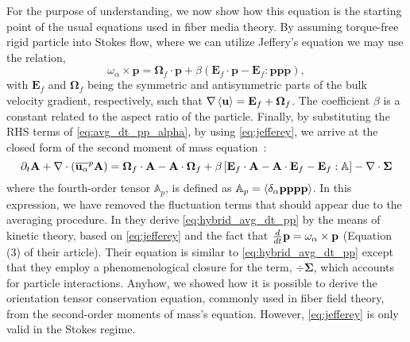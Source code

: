 For the purpose of understanding, we now show how this equation is the starting point of the usual equations used in fiber media theory. 
By assuming torque-free rigid particle into Stokes flow, where we can utilize Jeffery's equation \citep{guazzelli2011} we may use the relation,
\begin{equation}
    \omega_\alpha \times \textbf{p}
    = \bm{\Omega}_f\cdot\textbf{p}
    + \beta\left(
        \textbf{E}_f\cdot \textbf{p}
        - \textbf{E}_f : \textbf{ppp}
    \right),
    \label{eq:jefferey}
\end{equation}
with $\textbf{E}_f$ and $\bm{\Omega}_f$ being the symmetric and antisymmetric parts of the bulk velocity gradient, respectively, such that $\mathbf{\nabla}\left<\textbf{u}\right>=\textbf{E}_f+\bm{\Omega}_f$.
The coefficient $\beta$  is a constant related to the aspect ratio of the particle.
Finally, by substituting the RHS terms of \ref{eq:avg_dt_pp_alpha}, by using \ref{eq:jefferey}, we arrive at the closed form of the second moment of mass equation~:
\begin{equation}
    \partial_t \textbf{A}
    + \mathbf{\nabla}\cdot (
        \overline{\textbf{u}_\alpha}^{p}\textbf{A}
    )
    =
    \bm{\Omega}_f \cdot \textbf{A}
    - \textbf{A} \cdot \bm{\Omega}_f
    + \beta\left[
        \textbf{E}_f \cdot \textbf{A}
        -\textbf{A} \cdot \textbf{E}_f
        - \textbf{E}_f : \mathbb{A}
    \right]
    - \mathbf{\nabla}\cdot \mathbf{\Sigma}
    \label{eq:hybrid_avg_dt_pp}
\end{equation}
where the fourth-order tensor $\mathbb{A}_p$, is defined as $\mathbb{A}_p = \left<\delta_\alpha \textbf{pppp}\right>$.
In this expression, we have removed the fluctuation terms that should appear due to the averaging procedure. 
In \citet{wang2008objective} they derive \ref{eq:hybrid_avg_dt_pp} by the means of kinetic theory, based on \ref{eq:jefferey} and the fact that $\frac{d}{dt} \textbf{p} = \omega_\alpha \times \textbf{p}$ (Equation (3) of their article).
Their equation is similar to \ref{eq:hybrid_avg_dt_pp} except that they employ a phenomenological closure for the term, $\div \mathbf{\Sigma}$, which accounts for particle interactions.
Anyhow, we showed how it is possible to derive the orientation tensor conservation equation, commonly used in fiber field theory, from the second-order moments of mass's equation. 
However, \ref{eq:jefferey} is only valid in the Stokes regime. 


